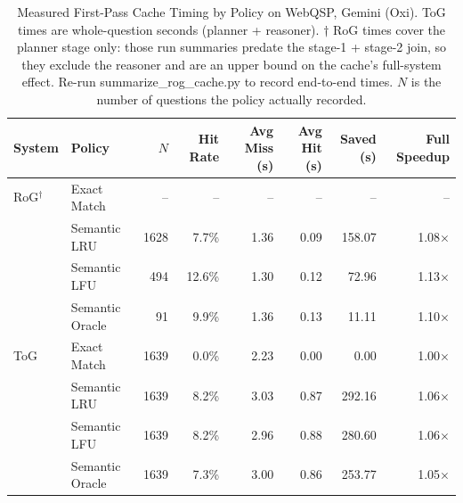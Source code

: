 \begin{table}[htbp]
\centering
\caption{Measured First-Pass Cache Timing by Policy on WebQSP, Gemini (Oxi). ToG times are whole-question seconds (planner + reasoner). $\dagger$ RoG times cover the planner stage only: those run summaries predate the stage-1 + stage-2 join, so they exclude the reasoner and are an upper bound on the cache's full-system effect. Re-run summarize\_rog\_cache.py to record end-to-end times. $N$ is the number of questions the policy actually recorded.}
\label{tab:live_cache_timing_webqsp_gemini_oxi}
\begin{tabular}{llrrrrrr}
\hline
\textbf{System} & \textbf{Policy} & \textbf{$N$} & \textbf{Hit Rate} & \textbf{Avg Miss (s)} & \textbf{Avg Hit (s)} & \textbf{Saved (s)} & \textbf{Full Speedup} \\
\hline
RoG$^{\dagger}$ & Exact Match      & -- & -- & -- & -- & -- & -- \\
     & Semantic LRU     & 1628 & 7.7\% & 1.36 & 0.09 & 158.07 & 1.08$\times$ \\
     & Semantic LFU     & 494 & 12.6\% & 1.30 & 0.12 & 72.96 & 1.13$\times$ \\
     & Semantic Oracle  & 91 & 9.9\% & 1.36 & 0.13 & 11.11 & 1.10$\times$ \\
\hline
ToG  & Exact Match      & 1639 & 0.0\% & 2.23 & 0.00 & 0.00 & 1.00$\times$ \\
     & Semantic LRU     & 1639 & 8.2\% & 3.03 & 0.87 & 292.16 & 1.06$\times$ \\
     & Semantic LFU     & 1639 & 8.2\% & 2.96 & 0.88 & 280.60 & 1.06$\times$ \\
     & Semantic Oracle  & 1639 & 7.3\% & 3.00 & 0.86 & 253.77 & 1.05$\times$ \\
\hline
\end{tabular}
\end{table}

